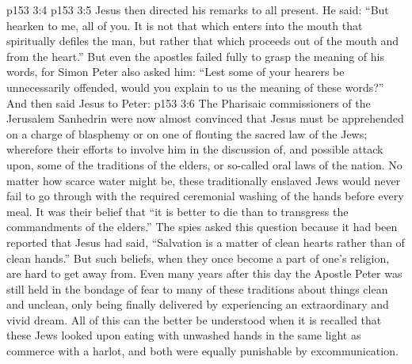 \vs p153 3:4 
\vs p153 3:5 Jesus then directed his remarks to all present. He said: “But hearken to me, all of you. It is not that which enters into the mouth that spiritually defiles the man, but rather that which proceeds out of the mouth and from the heart.” But even the apostles failed fully to grasp the meaning of his words, for Simon Peter also asked him: “Lest some of your hearers be unnecessarily offended, would you explain to us the meaning of these words?” And then said Jesus to Peter: 
\vs p153 3:6 The Pharisaic commissioners of the Jerusalem Sanhedrin were now almost convinced that Jesus must be apprehended on a charge of blasphemy or on one of flouting the sacred law of the Jews; wherefore their efforts to involve him in the discussion of, and possible attack upon, some of the traditions of the elders, or so\hyp{}called oral laws of the nation. No matter how scarce water might be, these traditionally enslaved Jews would never fail to go through with the required ceremonial washing of the hands before every meal. It was their belief that “it is better to die than to transgress the commandments of the elders.” The spies asked this question because it had been reported that Jesus had said, “Salvation is a matter of clean hearts rather than of clean hands.” But such beliefs, when they once become a part of one’s religion, are hard to get away from. Even many years after this day the Apostle Peter was still held in the bondage of fear to many of these traditions about things clean and unclean, only being finally delivered by experiencing an extraordinary and vivid dream. All of this can the better be understood when it is recalled that these Jews looked upon eating with unwashed hands in the same light as commerce with a harlot, and both were equally punishable by excommunication.

